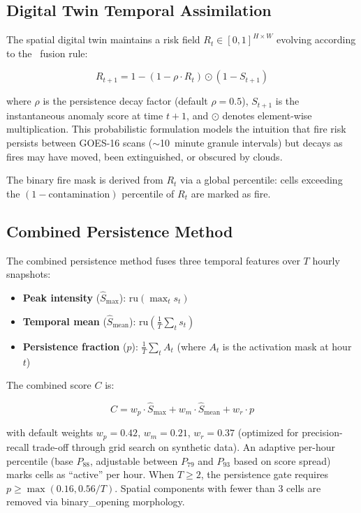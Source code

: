 \documentclass[11pt,twocolumn,a4paper]{article}
\newcommand{\abbrev}[1]{{\small\textsc{#1}}}
\newcommand{\prob}{\text{prob\_or}}
\newcommand{\ru}{\text{ru}}
\begin{document}
\subsection{Digital Twin Temporal Assimilation}

The spatial digital twin maintains a risk field $R_t \in [0,1]^{H \times W}$ evolving according to the \prob\ fusion rule:

\begin{equation}
R_{t+1} = 1 - (1 - \rho \cdot R_t) \odot (1 - S_{t+1})
\label{eq:probor}
\end{equation}

where $\rho$ is the persistence decay factor (default $\rho = 0.5$), $S_{t+1}$ is the instantaneous anomaly score at time $t+1$, and $\odot$ denotes element-wise multiplication. This probabilistic formulation models the intuition that fire risk persists between \abbrev{GOES-16} scans ($\sim$10~minute granule intervals) but decays as fires may have moved, been extinguished, or obscured by clouds.

The binary fire mask is derived from $R_t$ via a global percentile: cells exceeding the $(1 - \text{contamination})$ percentile of $R_t$ are marked as fire.

\subsection{Combined Persistence Method}

The combined persistence method fuses three temporal features over $T$ hourly snapshots:

\begin{itemize}
  \item \textbf{Peak intensity} ($\hat{S}_{\max}$): $\ru(\max_t s_t)$
  \item \textbf{Temporal mean} ($\hat{S}_{\text{mean}}$): $\ru(\frac{1}{T} \sum_t s_t)$
  \item \textbf{Persistence fraction} ($p$): $\frac{1}{T} \sum_t A_t$ (where $A_t$ is the activation mask at hour $t$)
\end{itemize}

The combined score $C$ is:

\begin{equation}
C = w_p \cdot \hat{S}_{\max} + w_m \cdot \hat{S}_{\text{mean}} + w_r \cdot p
\label{eq:combined}
\end{equation}

with default weights $w_p = 0.42$, $w_m = 0.21$, $w_r = 0.37$ (optimized for precision-recall trade-off through grid search on synthetic data). An adaptive per-hour percentile (base $P_{88}$, adjustable between $P_{79}$ and $P_{93}$ based on score spread) marks cells as ``active'' per hour. When $T \geq 2$, the persistence gate requires $p \geq \max(0.16, 0.56/T)$. Spatial components with fewer than 3 cells are removed via binary\_opening morphology.
\end{document}
